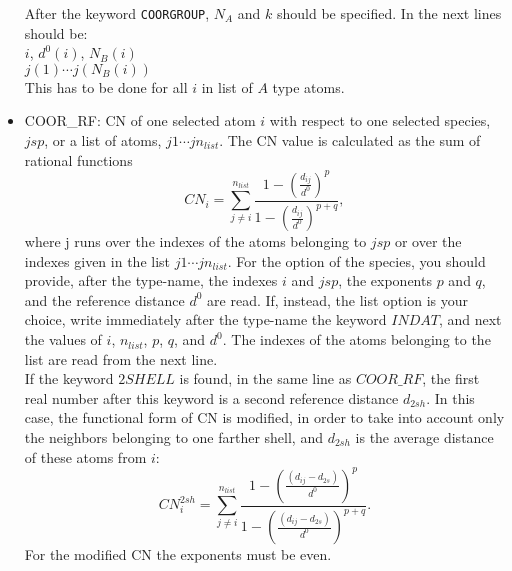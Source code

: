 \documentclass[twoside,10pt,titlepage,a4paper]{article}
\begin{document}
\begin{itemize}
\begin{equation}
\end{equation}
After the keyword {\tt COORGROUP}, $N_A$ and $k$ should be specified.
In the next lines should be:\\
 $i$, $d^0(i)$, $N_B(i)$ \\
 \hspace*{1cm}$j(1) \cdots j(N_B(i))$ \\
This has to be done for all $i$ in list of $A$ type atoms.
\item{COOR\_RF:} CN of one selected atom $i$ with respect to one selected
species, $jsp$, or a list of atoms, $j1 \cdots jn_{list}$.
The CN value is calculated as the sum of rational functions
\begin{equation}
CN_i = \sum_{j \neq i}^{n_{list}} \frac{1-\left(\frac{d_{ij}}{d^0}\right)^{p}}
{1-\left(\frac{d_{ij}}{d^0}\right)^{p+q}},
\end{equation}
where j runs over the indexes of the atoms belonging to $jsp$ or over the
indexes given in the list $j1 \cdots jn_{list}$.
For the option of the species, you should provide, after the type-name,
the indexes $i$ and $jsp$, the exponents $p$ and $q$, and the reference
distance $d^0$ are read. If, instead, the list option is your choice,
write immediately after the type-name the keyword $INDAT$, and next
the values of  $i$, $n_{list}$, $p$, $q$, and $d^0$. The indexes of the
atoms belonging to the list are read from the next line. \\
If the keyword $2SHELL$ is found, in the same line as $COOR\_RF$, the
first real number after this keyword is a second reference distance $d_{2sh}$.
In this case, the functional form of CN is modified, in order to take into
account only the neighbors belonging to one farther shell, and $d_{2sh}$ is
the average distance of these atoms from $i$:
\begin{equation}
CN_i^{2sh} = \sum_{j \neq i}^{n_{list}} \frac{1-\left(\frac{(d_{ij}-d_{2s})}{d^0}\right)^{p}}
{1-\left(\frac{(d_{ij}-d_{2s})}{d^0}\right)^{p+q}}.
\end{equation}
For the modified CN the exponents must be even.


\end{itemize}
\end{document}
